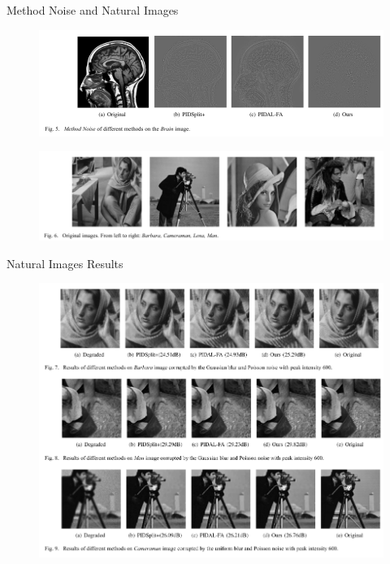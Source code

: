 \documentclass{beamer}
\begin{document}
\begin{frame}{Method Noise and Natural Images}

\begin{figure}
    \centering
    \includegraphics[scale=0.55]{Result_Brain1.PNG}
\end{figure}

\begin{figure}
    \centering
\includegraphics[scale=0.55]{Result_NaturalImages_Original.PNG}
\end{figure}
\end{frame}

\begin{frame}{Natural Images Results}
    \begin{figure}
        \centering
        \includegraphics[scale=0.5]{Result_NaturalImages.PNG}
    \end{figure}
\end{frame}
\end{document}
